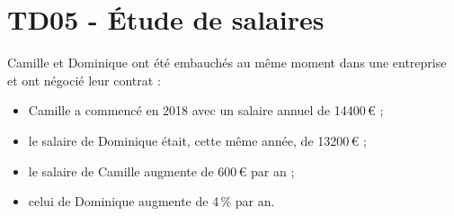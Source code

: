 \documentclass[a4paper,11pt]{article}
\author{Pierquet}
\title{\nomfichier}
\begin{document}
\pagestyle{fancy}

\part{TD05 - Étude de salaires}

\smallskip

\nomprenomtcbox

\smallskip

Camille et Dominique ont été embauchés au même moment dans une entreprise et ont négocié leur contrat :

\begin{itemize}%
	\item[\scriptsize\faIcon{money-bill-alt}] Camille a commencé en 2018 avec un salaire annuel de \num{14400}\,€ ;
	\item[\scriptsize\faIcon{money-bill-alt}] le salaire de Dominique était, cette même année, de \num{13200}\,€ ;
	\item[\scriptsize\faChartLine] le salaire de Camille augmente de 600\,€ par an ;
	\item[\scriptsize\faChartLine] celui de Dominique augmente de 4\,\% par an. 
\end{itemize} 
%
\end{document}
